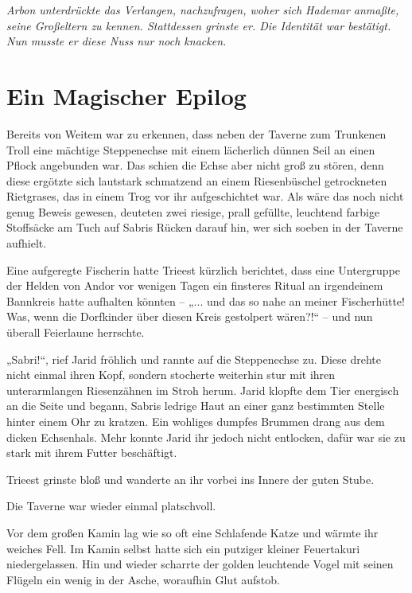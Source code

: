 \textit{Arbon unterdrückte das Verlangen, nachzufragen, woher sich Hademar anmaßte, seine Großeltern zu kennen. Stattdessen grinste er. Die Identität war bestätigt. Nun musste er diese Nuss nur noch knacken.}




\newpage
\section{Ein Magischer Epilog}


Bereits von Weitem war zu erkennen, dass neben der Taverne zum Trunkenen Troll eine mächtige Steppenechse mit einem lächerlich dünnen Seil an einen Pflock angebunden war. Das schien die Echse aber nicht groß zu stören, denn diese ergötzte sich lautstark schmatzend an einem Riesenbüschel getrockneten Rietgrases, das in einem Trog vor ihr aufgeschichtet war. Als wäre das noch nicht genug Beweis gewesen, deuteten zwei riesige, prall gefüllte, leuchtend farbige Stoffsäcke am Tuch auf Sabris Rücken darauf hin, wer sich soeben in der Taverne aufhielt.

Eine aufgeregte Fischerin hatte Trieest kürzlich berichtet, dass eine Untergruppe der Helden von Andor vor wenigen Tagen ein finsteres Ritual an irgendeinem Bannkreis hatte aufhalten könnten – „... und das so nahe an meiner Fischerhütte! Was, wenn die Dorfkinder über diesen Kreis gestolpert wären?!“ – und nun überall Feierlaune herrschte.

„Sabri!“, rief Jarid fröhlich und rannte auf die Steppenechse zu. Diese drehte nicht einmal ihren Kopf, sondern stocherte weiterhin stur mit ihren unterarmlangen Riesenzähnen im Stroh herum. Jarid klopfte dem Tier energisch an die Seite und begann, Sabris ledrige Haut an einer ganz bestimmten Stelle hinter einem Ohr zu kratzen. Ein wohliges dumpfes Brummen drang aus dem dicken Echsenhals. Mehr konnte Jarid ihr jedoch nicht entlocken, dafür war sie zu stark mit ihrem Futter beschäftigt.

Trieest grinste bloß und wanderte an ihr vorbei ins Innere der guten Stube.

Die Taverne war wieder einmal platschvoll.

Vor dem großen Kamin lag wie so oft eine Schlafende Katze und wärmte ihr weiches Fell. Im Kamin selbst hatte sich ein putziger kleiner Feuertakuri niedergelassen. Hin und wieder scharrte der golden leuchtende Vogel mit seinen Flügeln ein wenig in der Asche, woraufhin Glut aufstob.


